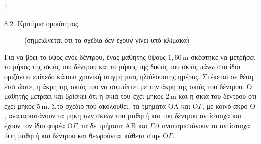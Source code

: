 \begin{ylh}{1}
    \item 8.2. Κριτήρια ομοιότητας.
\end{ylh}
\begin{figure}
    \centering
    \caption*{\scriptsize (σημειώνεται ότι τα σχέδια δεν έχουν γίνει υπό κλίμακα)}
\end{figure}
Για να βρει το ύψος ενός δέντρου, ένας μαθητής ύψους $1,60\,\text{m}$ σκέφτηκε να μετρήσει το μήκος της σκιάς του δέντρου και το μήκος της δικιάς του σκιάς πάνω στο ίδιο οριζόντιο επίπεδο κάποια χρονική στιγμή μιας ηλιόλουστης ημέρας. Στέκεται σε θέση έτσι ώστε, η άκρη της σκιάς του να συμπίπτει με την άκρη της σκιάς του δέντρου. Ο μαθητής μετράει και βρίσκει ότι η σκιά του έχει μήκος $2\,\text{m}$ και η σκιά του δέντρου ότι έχει μήκος $5\,\text{m}$.
Στο σχέδιο που ακολουθεί, τα τμήματα $\text{OA}$ και $\text{O}\Gamma$, με κοινό άκρο $\text{O}$, αναπαριστάνουν τα μήκη των σκιών του μαθητή και του δέντρου αντίστοιχα και έχουν τον ίδιο φορέα $\text{O}\Gamma$, τα δε τμήματα $\text{AB}$ και $\Gamma\Delta$ αναπαριστάνουν τα αντίστοιχα ύψη μαθητή και δέντρου και θεωρούνται κάθετα στην $\text{O}\Gamma$.

